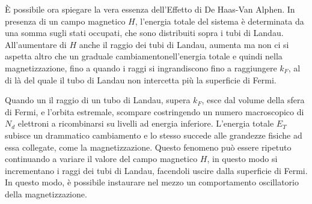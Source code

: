 \`E possibile ora spiegare la vera essenza dell'Effetto di De Haas-Van Alphen. In presenza di un campo magnetico $H$, l'energia totale del sistema \`e determinata da una somma sugli stati occupati, che sono distribuiti sopra i tubi di Landau. All'aumentare di $H$ anche il raggio dei tubi di Landau, aumenta ma non ci si aspetta altro che un graduale cambiamentonell'energia totale e quindi nella magnetizzazione, fino a quando i raggi si ingrandiscono fino a raggiungere $k_F$, al di l\`a del quale il tubo di Landau non intercetta pi\`u la superficie di Fermi.

Quando un il raggio di un tubo di Landau, supera $k_F$, esce dal volume della sfera di Fermi, e l'orbita estremale, scompare costringendo un numero macroscopico di $N_d$ elettroni a ricombinarsi su livelli ad energia inferiore. L'energia totale $E_T$ subisce un drammatico cambiamento e lo stesso succede alle grandezze fisiche ad essa collegate, come la magnetizzazione. Questo fenomeno pu\`o essere ripetuto continuando a variare il valore del campo magnetico $H$, in questo modo si incrementano i raggi dei tubi di Landau, facendoli uscire dalla superficie di Fermi. In questo modo, \`e possibile instaurare nel mezzo un comportamento oscillatorio della magnetizzazione.

